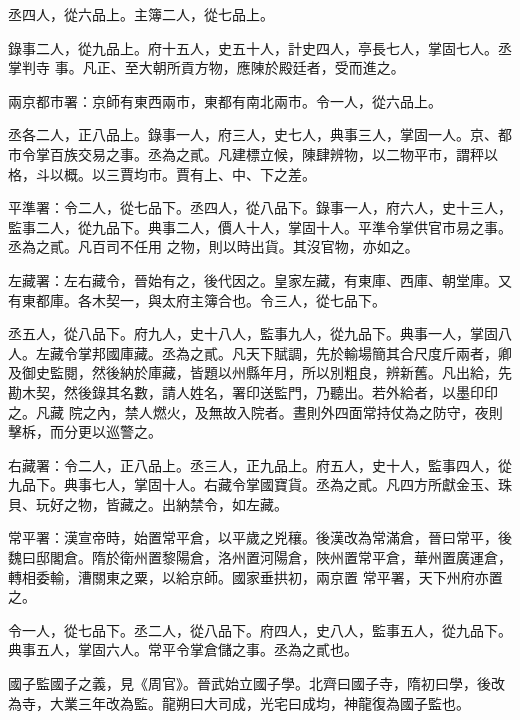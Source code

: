 \begin{pinyinscope}
 丞四人，從六品上。主簿二人，從七品上。



 錄事二人，從九品上。府十五人，史五十人，計史四人，亭長七人，掌固七人。丞掌判寺
 事。凡正、至大朝所貢方物，應陳於殿廷者，受而進之。



 兩京都市署：京師有東西兩市，東都有南北兩市。令一人，從六品上。



 丞各二人，正八品上。錄事一人，府三人，史七人，典事三人，掌固一人。京、都市令掌百族交易之事。丞為之貳。凡建標立候，陳肆辨物，以二物平市，謂秤以格，斗以概。以三賈均市。賈有上、中、下之差。



 平準署：令二人，從七品下。丞四人，從八品下。錄事一人，府六人，史十三人，監事二人，從九品下。典事二人，價人十人，掌固十人。平準令掌供官市易之事。丞為之貳。凡百司不任用
 之物，則以時出貨。其沒官物，亦如之。



 左藏署：左右藏令，晉始有之，後代因之。皇家左藏，有東庫、西庫、朝堂庫。又有東都庫。各木契一，與太府主簿合也。令三人，從七品下。



 丞五人，從八品下。府九人，史十八人，監事九人，從九品下。典事一人，掌固八人。左藏令掌邦國庫藏。丞為之貳。凡天下賦調，先於輸場簡其合尺度斤兩者，卿及御史監閱，然後納於庫藏，皆題以州縣年月，所以別粗良，辨新舊。凡出給，先勘木契，然後錄其名數，請人姓名，署印送監門，乃聽出。若外給者，以墨印印之。凡藏
 院之內，禁人燃火，及無故入院者。晝則外四面常持仗為之防守，夜則擊柝，而分更以巡警之。



 右藏署：令二人，正八品上。丞三人，正九品上。府五人，史十人，監事四人，從九品下。典事七人，掌固十人。右藏令掌國寶貨。丞為之貳。凡四方所獻金玉、珠貝、玩好之物，皆藏之。出納禁令，如左藏。



 常平署：漢宣帝時，始置常平倉，以平歲之兇穰。後漢改為常滿倉，晉曰常平，後魏曰邸閣倉。隋於衛州置黎陽倉，洛州置河陽倉，陜州置常平倉，華州置廣運倉，轉相委輸，漕關東之粟，以給京師。國家垂拱初，兩京置
 常平署，天下州府亦置之。



 令一人，從七品下。丞二人，從八品下。府四人，史八人，監事五人，從九品下。典事五人，掌固六人。常平令掌倉儲之事。丞為之貳也。



 國子監國子之義，見《周官》。晉武始立國子學。北齊曰國子寺，隋初曰學，後改為寺，大業三年改為監。龍朔曰大司成，光宅曰成均，神龍復為國子監也。




\end{pinyinscope}
